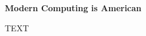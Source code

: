\begin{tcolorbox}[breakable, enhanced, colback=textbook-blue, sharp corners]
	\vspace{3mm}
	\begin{center}
		\textbf{Modern Computing is American}
	\end{center}
	TEXT
	\vspace{3mm}
\end{tcolorbox}
\vspace{2\baselineskip}

